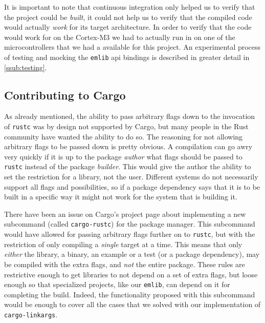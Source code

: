 It is important to note that continuous integration only helped us to verify that the project could be \emph{built}, it could not help us to verify that the compiled code would actually \emph{work} for its target architecture.
In order to verify that the code would work for on the Cortex-M3 we had to actually run in on one of the microcontrollers that we had a available for this project.
An experimental process of testing and mocking the \texttt{emlib} \gls{api} bindings is described in greater detail in \autoref{ssub:testing}.

\subsection{Contributing to Cargo}
\label{ssub:contributing_to_cargo}

As already mentioned, the ability to pass arbitrary flags down to the invocation of \texttt{rustc} was by design not supported by Cargo, but many people in the Rust community have wanted the ability to do so.
The reasoning for not allowing arbitrary flags to be passed down is pretty obvious.
A compilation can go awry very quickly if it is up to the package \emph{author} what flags should be passed to \texttt{rustc} instead of the package \emph{builder}.
This would give the author the ability to set the restriction for a library, not the user.
Different systems do not necessarily support all flags and possibilities, so if a package dependency says that it is to be built in a specific way it might not work for the system that is building it.

There have been an issue on Cargo's project page about implementing a new subcommand (called \texttt{cargo-rustc}) for the package manager.
This subcommand would have allowed for passing arbitrary flags further on to \texttt{rustc}, but with the restriction of only compiling a \emph{single} target at a time.
This means that only \emph{either} the library, a binary, an example or a test (or a package dependency), may be compiled with the extra flags, and \emph{not} the entire package.
These rules are restrictive enough to get libraries to not depend on a set of extra flags, but loose enough so that specialized projects, like our \texttt{emlib}, can depend on it for completing the build.
Indeed, the functionality proposed with this subcommand would be enough to cover all the cases that we solved with our implementation of \texttt{cargo-linkargs}.

